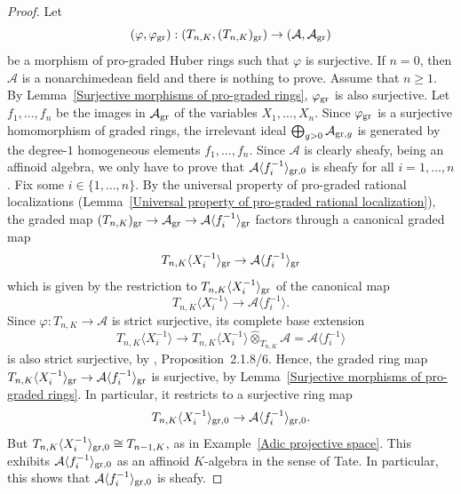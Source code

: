\documentclass[12pt,twoside,a4paper]{article}
\theoremstyle{definition}
\theoremstyle{remark}
\newcommand\gr{{\rm gr}}
\begin{document}
\begin{proof}Let \begin{equation*}(\varphi, \varphi_{\gr}): (T_{n, K}, (T_{n, K})_{\gr})\to (\mathcal{A}, \mathcal{A}_{\gr})\end{equation*}be a morphism of pro-graded Huber rings such that $\varphi$ is surjective. If $n=0$, then $\mathcal{A}$ is a nonarchimedean field and there is nothing to prove. Assume that $n\geq1$. By Lemma~\ref{Surjective morphisms of pro-graded rings}, $\varphi_{\gr}$ is also surjective. Let $f_1,\dots, f_n$ be the images in $\mathcal{A}_{\gr}$ of the variables $X_1,\dots, X_n$. Since $\varphi_{\gr}$ is a surjective homomorphism of graded rings, the irrelevant ideal $\bigoplus_{g>0}\mathcal{A}_{\gr, g}$ is generated by the degree-$1$ homogeneous elements $f_1,\dots, f_n$. Since $\mathcal{A}$ is clearly sheafy, being an affinoid algebra, we only have to prove that $\mathcal{A}\langle f_{i}^{-1}\rangle_{\gr, 0}$ is sheafy for all $i=1,\dots, n$. Fix some $i\in\{1,\dots, n\}$. By the universal property of pro-graded rational localizations (Lemma~\ref{Universal property of pro-graded rational localization}), the graded map $(T_{n, K})_{\gr}\to \mathcal{A}_{\gr}\to \mathcal{A}\langle f_{i}^{-1}\rangle_{\gr}$ factors through a canonical graded map \begin{equation*}T_{n, K}\langle X_{i}^{-1}\rangle_{\gr}\to \mathcal{A}\langle f_{i}^{-1}\rangle_{\gr}\end{equation*}which is given by the restriction to $T_{n, K}\langle X_{i}^{-1}\rangle_{\gr}$ of the canonical map \begin{equation*}T_{n, K}\langle X_{i}^{-1}\rangle\to \mathcal{A}\langle f_{i}^{-1}\rangle.\end{equation*}Since $\varphi: T_{n, K}\to \mathcal{A}$ is strict surjective, its complete base extension \begin{equation*}T_{n, K}\langle X_{i}^{-1}\rangle\to T_{n, K}\langle X_{i}^{-1}\rangle\widehat{\otimes}_{T_{n, K}}\mathcal{A}=\mathcal{A}\langle f_{i}^{-1}\rangle\end{equation*}is also strict surjective, by \cite{BGR}, Proposition~2.1.8/6. Hence, the graded ring map $T_{n, K}\langle X_{i}^{-1}\rangle_{\gr}\to \mathcal{A}\langle f_{i}^{-1}\rangle_{\gr}$ is surjective, by Lemma~\ref{Surjective morphisms of pro-graded rings}. In particular, it restricts to a surjective ring map \begin{equation*}T_{n, K}\langle X_{i}^{-1}\rangle_{\gr, 0}\to \mathcal{A}\langle f_{i}^{-1}\rangle_{\gr, 0}.\end{equation*}But $T_{n, K}\langle X_{i}^{-1}\rangle_{\gr, 0}\cong T_{n-1, K}$, as in Example~\ref{Adic projective space}. This exhibits $\mathcal{A}\langle f_{i}^{-1}\rangle_{\gr, 0}$ as an affinoid $K$-algebra in the sense of Tate. In particular, this shows that $\mathcal{A}\langle f_{i}^{-1}\rangle_{\gr, 0}$ is sheafy. \end{proof}  
\end{document}
